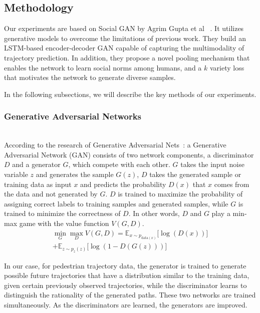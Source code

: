 \subsection{Methodology}

Our experiments are based on Social GAN by Agrim Gupta et al ~\cite{Gupta_2018_CVPR}. It utilizes generative models to overcome the limitations of previous work. They build an LSTM-based encoder-decoder GAN capable of capturing the multimodality of trajectory prediction. In addition, they propose a novel pooling mechanism that enables the network to learn social norms among humans, and a $k$ variety loss that motivates the network to generate diverse samples.

In the following subsections, we will describe the key methods of our experiments.


\subsubsection{Generative Adversarial Networks}
\hfill \\
According to the research of Generative Adversarial Nets~\cite{gan}: a Generative Adversarial Network (GAN) consists of two network components, a discriminator $D$ and a generator $G$, which compete with each other. $G$ takes the input noise variable $z$ and generates the sample $G(z)$, $D$ takes the generated sample or training data as input $x$ and predicts the probability $D(x)$ that $x$ comes from the data and not generated by $G$. $D$ is trained to maximize the probability of assigning correct labels to training samples and generated samples, while $G$ is trained to minimize the correctness of $D$. In other words, $D$ and $G$ play a min-max game with the value function $V(G, D)$.
\begin{multline}
  \min_{G} \max_{D} V(G, D) = \mathbb{E}_{x \sim p_{\text{data}(x)}} \lbrack \log(D(x))\rbrack \\ + \mathbb{E}_{z \sim p_{z}(z)} \lbrack \log(1 - D(G(z))) \rbrack
\end{multline}


In our case, for pedestrian trajectory data, the generator is trained to generate possible future trajectories that have a distribution similar to the training data, given certain previously observed trajectories, while the discriminator learns to distinguish the rationality of the generated paths. These two networks are trained simultaneously. As the discriminators are learned, the generators are improved.



